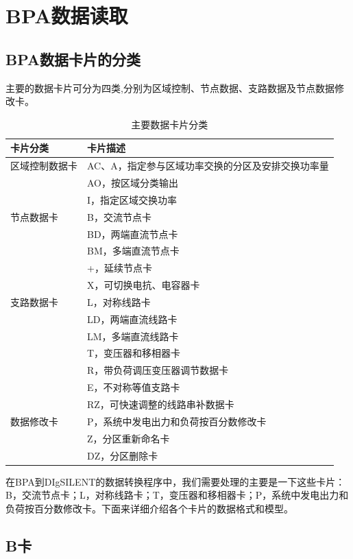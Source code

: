 \chapter{BPA数据读取}

\section{BPA数据卡片的分类}

主要的数据卡片可分为四类,分别为区域控制、节点数据、支路数据及节点数据修改卡。

\begin{table}[h]
\centering
\begin{tabular}{ll}
\toprule
卡片分类 & 卡片描述\\
\midrule
 区域控制数据卡 & AC、A，指定参与区域功率交换的分区及安排交换功率量 \\ 
 & AO，按区域分类输出 \\ 
 & I，指定区域交换功率 \\ 
 \midrule
 节点数据卡 & B，交流节点卡\\
 & BD，两端直流节点卡\\
 & BM，多端直流节点卡\\
 & +，延续节点卡\\
 & X，可切换电抗、电容器卡\\
 \midrule
 支路数据卡 & L，对称线路卡\\
 & LD，两端直流线路卡\\
 & LM，多端直流线路卡\\
 & T，变压器和移相器卡\\
 & R，带负荷调压变压器调节数据卡\\
 & E，不对称等值支路卡\\
 & RZ，可快速调整的线路串补数据卡\\
 \midrule
 数据修改卡 & P，系统中发电出力和负荷按百分数修改卡\\
 & Z，分区重新命名卡\\
 & DZ，分区删除卡\\
\bottomrule
\end{tabular}
\caption{主要数据卡片分类}
\end{table}

在BPA到DIgSILENT的数据转换程序中，我们需要处理的主要是一下这些卡片：B，交流节点卡；L，对称线路卡；T，变压器和移相器卡；P，系统中发电出力和负荷按百分数修改卡。下面来详细介绍各个卡片的数据格式和模型。

\section{B卡}

